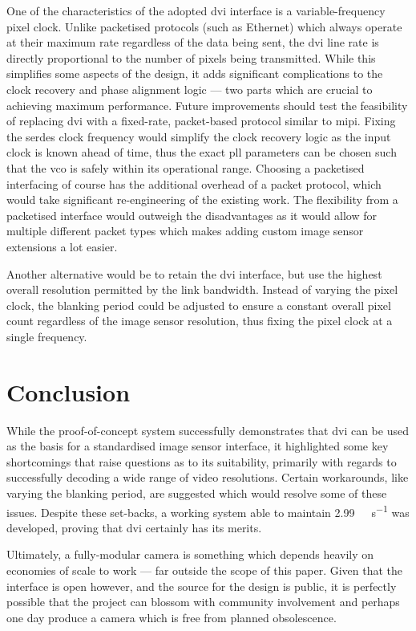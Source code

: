 One of the characteristics of the adopted \gls{dvi} interface is a variable-frequency pixel clock. Unlike packetised protocols (such as Ethernet) which always operate at their maximum rate regardless of the data being sent, the \gls{dvi} line rate is directly proportional to the number of pixels being transmitted. While this simplifies some aspects of the design, it adds significant complications to the clock recovery and phase alignment logic --- two parts which are crucial to achieving maximum performance. Future improvements should test the feasibility of replacing \gls{dvi} with a fixed-rate, packet-based protocol similar to \gls{mipi}. Fixing the \gls{serdes} clock frequency would simplify the clock recovery logic as the input clock is known ahead of time, thus the exact \gls{pll} parameters can be chosen such that the \gls{vco} is safely within its operational range. Choosing a packetised interfacing of course has the additional overhead of a packet protocol, which would take significant re-engineering of the existing work. The flexibility from a packetised interface would outweigh the disadvantages as it would allow for multiple different packet types which makes adding custom image sensor extensions a lot easier.

Another alternative would be to retain the \gls{dvi} interface, but use the highest overall resolution permitted by the link bandwidth. Instead of varying the pixel clock, the blanking period could be adjusted to ensure a constant overall pixel count regardless of the image sensor resolution, thus fixing the pixel clock at a single frequency.

\section{Conclusion}

While the proof-of-concept system successfully demonstrates that \gls{dvi} can be used as the basis for a standardised image sensor interface, it highlighted some key shortcomings that raise questions as to its suitability, primarily with regards to successfully decoding a wide range of video resolutions. Certain workarounds, like varying the blanking period, are suggested which would resolve some of these issues. Despite these set-backs, a working system able to maintain \SI{2.99}{\giga\bit\per\second} was developed, proving that \gls{dvi} certainly has its merits. 

Ultimately, a fully-modular camera is something which depends heavily on economies of scale to work --- far outside the scope of this paper. Given that the interface is open however, and the source for the design is public, it is perfectly possible that the project can blossom with community involvement and perhaps one day produce a camera which is free from planned obsolescence.